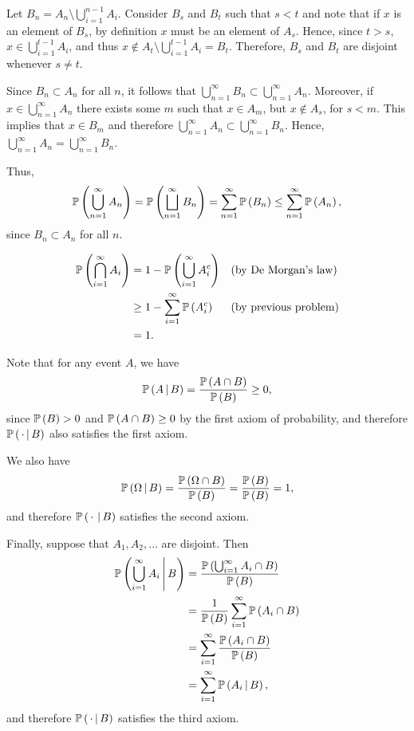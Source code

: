\begin{ex}
  Let $B_n=A_n\setminus \bigcup_{i=1}^{n-1}A_i$. Consider $B_s$ and $B_t$ such
  that $s<t$ and note that if $x$ is an element of $B_s$, by definition $x$ must
  be an element of $A_s$. Hence, since $t>s$,
  $x\in\bigcup_{i=1}^{t-1} A_i$, and thus
  $x\not\in A_t\setminus \bigcup_{i=1}^{t-1}A_i=B_t$. Therefore, $B_s$ and $B_t$
  are disjoint whenever $s\neq t$.

  Since $B_n\subset A_n$ for all $n$, it follows that
  $\bigcup_{n=1}^\infty B_n\subset \bigcup_{n=1}^\infty A_n$. Moreover, if
  $x\in \bigcup_{n=1}^\infty A_n$ there exists some $m$ such that $x\in A_m$,
  but $x\not\in A_s$, for $s<m$. This implies that $x\in B_m$ and therefore
  $\bigcup_{n=1}^\infty A_n\subset \bigcup_{n=1}^\infty B_n$. Hence,
  $\bigcup_{n=1}^\infty A_n= \bigcup_{n=1}^\infty B_n$.

  Thus,
  $$
    \P{\bigcup_{n=1}^\infty A_n}=
    \P{\bigsqcup_{n=1}^\infty B_n}
    =\sum_{n=1}^\infty \P{B_n}
    \leq \sum_{n=1}^\infty \P{A_n},
  $$
  since $B_n\subset A_n$ for all $n$.
\end{ex}

\begin{ex}
  \begin{align*}
    \P{\bigcap_{i=1}^\infty A_i}
     & =1-\P{\bigcup_{i=1}^\infty A_i^c} &  & \text{(by De Morgan's law)}  \\
     & \geq 1-\sum_{i=1}^\infty\P{A_i^c} &  & \text{(by previous problem)} \\
     & =1.
  \end{align*}
\end{ex}

\begin{ex}
  Note that for any event $A$, we have
  \[
    \cP{A}{B}
    =\frac{\P{A\cap B}}{\P{B}}\geq 0,
  \]
  since $\P{B}> 0$ and $\P{A\cap B}\geq 0$ by the first axiom of probability,
  and therefore $\cP{\,\cdot}{B}$ also satisfies the first axiom.

  We also have
  \[
    \cP{\Omega}{B}=\frac{\P{\Omega\cap B}}{\P{B}}=\frac{\P{B}}{\P{B}}=1,
  \]
  and therefore $\cP{\,\cdot\,}{B}$ satisfies the second axiom.

  Finally, suppose that $A_1, A_2, \ldots$ are disjoint. Then
  \begin{align*}
    \cP{\bigcup_{i=1}^\infty A_i}{B}
     & =\frac{\P{\bigcup_{i=1}^\infty A_i\cap B}}{\P{B}} \\
     & =\frac{1}{\P{B}}\sum_{i=1}^\infty \P{A_i \cap B}  \\
     & =\sum_{i=1}^\infty \frac{\P{A_i \cap B}}{\P{B}}   \\
     & =\sum_{i=1}^\infty \cP{A_i}{B},
  \end{align*}
  and therefore $\cP{\,\cdot}{B}$ satisfies the third axiom.
\end{ex}

